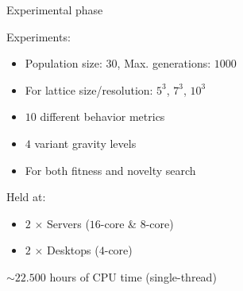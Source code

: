 \documentclass[6pt]{beamer}
\begin{document}

\begin{frame}{Experimental phase}
\begin{block}{Experiments:}
\begin{itemize}
\item Population size: $30$, Max. generations: $1000$
\item For lattice size/resolution: $5^3$, $7^3$, $10^3$
\item $10$ different behavior metrics
\item $4$ variant gravity levels
\item For both fitness and novelty search
\end{itemize}
\end{block}
\begin{block}{Held at:}
\begin{itemize}
\item $2$ $\times$ Servers ($16$-core \& $8$-core)
\item $2$ $\times$ Desktops ($4$-core)
\end{itemize}
\end{block}
\alert{$\sim 22.500$ hours of CPU time (single-thread)}
\end{frame}
\end{document}
